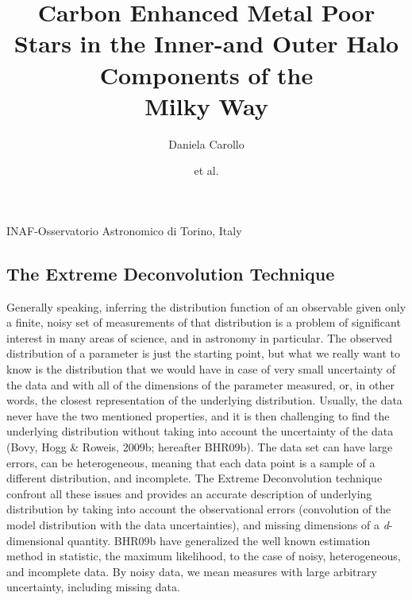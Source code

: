 \documentclass[apj]{emulateapj}
\begin{document}

\title{Carbon Enhanced Metal Poor Stars in the Inner-and Outer Halo Components of the\\ Milky Way}


\author{Daniela Carollo}

\author{et al.}


 {INAF-Osservatorio Astronomico di Torino, Italy}

\begin{abstract}

\end{abstract}


\subsection{The Extreme Deconvolution Technique}

Generally speaking, inferring the distribution function of an observable given only a finite, noisy set of measurements of that distribution is a problem of significant interest in many areas of science, and in astronomy in particular. The observed distribution of a parameter is just the starting point, but what we really want to know is the distribution that we would have in case of very small uncertainty of the data and with all of the dimensions of the parameter measured, or, in other words, the closest representation of the underlying distribution. Usually, the data never have the two mentioned properties, and it is then challenging to find the underlying distribution without taking into account the uncertainty of the data (Bovy, Hogg \& Roweis, 2009b; hereafter BHR09b). The data set can have large errors, can be heterogeneous, meaning that each data point is a sample of a different distribution, and incomplete. The Extreme Deconvolution technique confront all these issues and provides an accurate description of underlying distribution by taking into account the observational errors (convolution of the model distribution with the data uncertainties), and missing dimensions of a \emph{d}-dimensional quantity.
BHR09b have generalized the well known estimation method in statistic, the maximum likelihood, to the case of noisy, heterogeneous, and incomplete data. By noisy data, we mean measures with large arbitrary uncertainty, including missing data.
\end{document}
